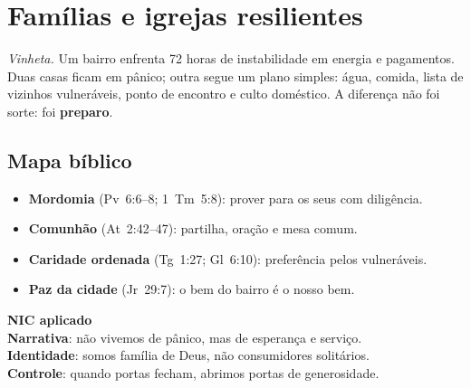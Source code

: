\chapter{Famílias e igrejas resilientes}
\noindent\textit{Vinheta.} Um bairro enfrenta 72 horas de instabilidade em energia e pagamentos. Duas casas ficam em pânico; outra segue um plano simples: água, comida, lista de vizinhos vulneráveis, ponto de encontro e culto doméstico. A diferença não foi sorte: foi \textbf{preparo}.

\section{Mapa bíblico}
\begin{itemize}[leftmargin=*,noitemsep]
  \item \textbf{Mordomia} (Pv~6:6--8; 1~Tm~5:8): prover para os seus com diligência.
  \item \textbf{Comunhão} (At~2:42--47): partilha, oração e mesa comum.
  \item \textbf{Caridade ordenada} (Tg~1:27; Gl~6:10): preferência pelos vulneráveis.
  \item \textbf{Paz da cidade} (Jr~29:7): o bem do bairro é o nosso bem.
\end{itemize}

\begin{nicbox}
\textbf{NIC aplicado}\\
\textbf{Narrativa}: não vivemos de pânico, mas de esperança e serviço.\\
\textbf{Identidade}: somos família de Deus, não consumidores solitários.\\
\textbf{Controle}: quando portas fecham, abrimos portas de generosidade.
\end{nicbox}

